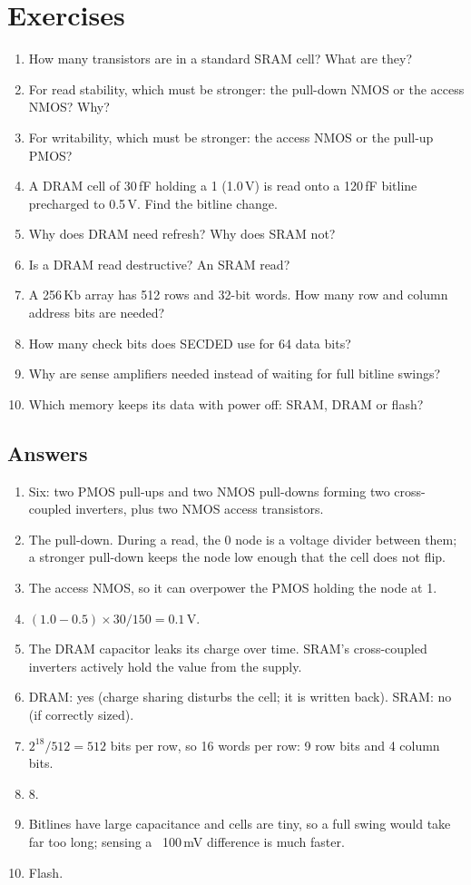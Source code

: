 \section{Exercises}

\begin{enumerate}
  \item How many transistors are in a standard SRAM cell? What are they?
  \item For read stability, which must be stronger: the pull-down NMOS or the access NMOS? Why?
  \item For writability, which must be stronger: the access NMOS or the pull-up PMOS?
  \item A DRAM cell of 30\,fF holding a 1 (1.0\,V) is read onto a 120\,fF bitline precharged to 0.5\,V. Find the bitline change.
  \item Why does DRAM need refresh? Why does SRAM not?
  \item Is a DRAM read destructive? An SRAM read?
  \item A 256\,Kb array has 512 rows and 32-bit words. How many row and column address bits are needed?
  \item How many check bits does SECDED use for 64 data bits?
  \item Why are sense amplifiers needed instead of waiting for full bitline swings?
  \item Which memory keeps its data with power off: SRAM, DRAM or flash?
\end{enumerate}

\subsection*{Answers}
\begin{enumerate}
  \item Six: two PMOS pull-ups and two NMOS pull-downs forming two cross-coupled inverters, plus two NMOS access transistors.
  \item The pull-down. During a read, the 0 node is a voltage divider between them; a stronger pull-down keeps the node low enough that the cell does not flip.
  \item The access NMOS, so it can overpower the PMOS holding the node at 1.
  \item $(1.0 - 0.5) \times 30/150 = 0.1$\,V.
  \item The DRAM capacitor leaks its charge over time. SRAM's cross-coupled inverters actively hold the value from the supply.
  \item DRAM: yes (charge sharing disturbs the cell; it is written back). SRAM: no (if correctly sized).
  \item $2^{18}/512 = 512$ bits per row, so 16 words per row: 9 row bits and 4 column bits.
  \item 8.
  \item Bitlines have large capacitance and cells are tiny, so a full swing would take far too long; sensing a ~100\,mV difference is much faster.
  \item Flash.
\end{enumerate}
